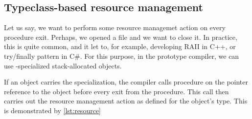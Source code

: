 \subsection{Typeclass-based resource management}
\label{sec:tcResMan}

Let us say, we want to perform some resource managemet action on every procedure exit. Perhaps, we opened a file and we want to close it. In practice, this is quite common, and it let to, for example, developing RAII in C++, or try/finally pattern in C\#. For this purpose, in the prototype compiler, we can use -specialized stack-allocated objects.

If an object carries the  specialization, the compiler calls  procedure on the pointer reference to the object before every exit from the procedure. This  call then carries out the resource management action as defined for the object's type. This is demonstrated by \cref{lst:resource}

